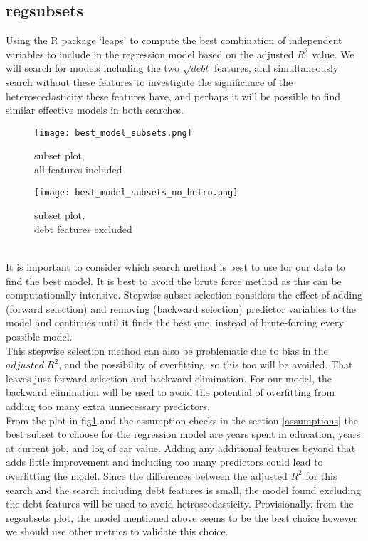 \documentclass[journal]{IEEEtran}
\begin{document}
\subsection{regsubsets}\label{regsubsets}
Using the R package `leaps'\cite{leaps} to compute the best combination of independent variables to include in the regression model based on the adjusted $R^2$ value. We will search for models including the two $\sqrt{debt}$ features, and simultaneously search without these features to investigate the significance of the heteroscedasticity these features have, and perhaps it will be possible to find similar effective models in both searches.
\begin{figure}[h] 
\centering
\begin{minipage}{.25\textwidth}
  \centering
    \texttt{[image: best\_model\_subsets.png]}
    \caption{subset plot,\\ all features included}
    \label{fig:regsubsets}
\end{minipage}%
\begin{minipage}{.25\textwidth}
  \centering
    \texttt{[image: best\_model\_subsets\_no\_hetro.png]}
    \caption{subset plot,\\ debt features excluded}
    \label{fig:regsubsets_no_hetro}
\end{minipage}%
\end{figure}
\\
\indent
It is important to consider which search method is best to use for our data to find the best model. It is best to avoid the brute force method as this can be computationally intensive. Stepwise subset selection considers the effect of adding (forward selection) and removing (backward selection) predictor variables to the model and continues until it finds the best one, instead of brute-forcing every possible model.\\\indent This stepwise selection method can also be problematic due to bias in the $adjusted \; R^2$\cite{stepwisebad}, and the possibility of overfitting, so this too will be avoided. That leaves just forward selection and backward elimination. For our model, the backward elimination will be used to avoid the potential of overfitting from adding too many extra unnecessary predictors.  
\\
\indent
From the plot in fig\ref{fig:regsubsets_no_hetro} and the assumption checks in the section \ref{assumptions} the best subset to choose for the regression model are years spent in education, years at current job, and log of car value. Adding any additional features beyond that adds little improvement and including too many predictors could lead to overfitting the model\cite{overfitting}. Since the differences between the adjusted $R^2$ for this search and the search including debt features is small, the model found excluding the debt features will be used to avoid hetroscedasticity. Provisionally, from the regsubsets plot, the model mentioned above seems to be the best choice however we should use other metrics to validate this choice.\\
\end{document}
